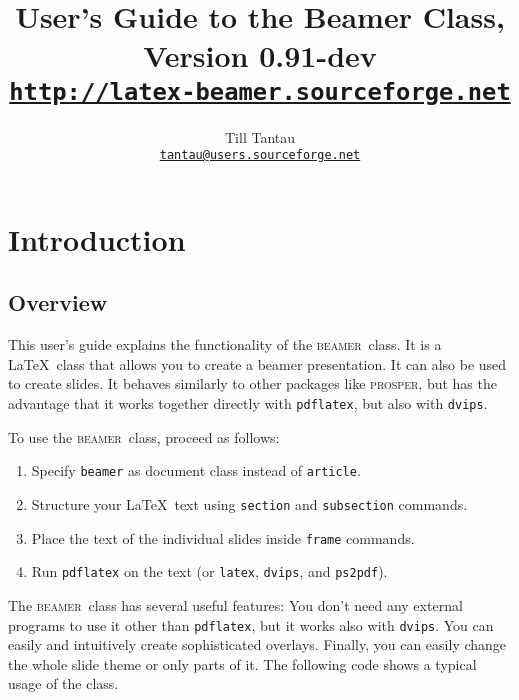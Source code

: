 \documentclass{article}
\def\beamer{\textsc{beamer}}
\begin{document}
\title{User's Guide to the Beamer Class, Version 0.91-dev\\
\Large\href{http://latex-beamer.sourceforge.net}{\texttt{http://latex-beamer.sourceforge.net}}}
\author{Till Tantau\\
  \href{mailto:tantau@users.sourceforge.net}{\texttt{tantau@users.sourceforge.net}}}

\maketitle

\tableofcontents



\section{Introduction}


\subsection{Overview}

This user's guide explains the functionality of the \beamer\ class.
It is a \LaTeX\ class that allows you to create a beamer
presentation. It can also be used to create slides. It behaves
similarly to other packages like \textsc{prosper}, but has the
advantage that it works together directly with \texttt{pdflatex}, but
also with \texttt{dvips}.

To use the \beamer\ class, proceed as follows:
\begin{enumerate}
\item
  Specify \texttt{beamer} as document class instead of
  \texttt{article}.
\item
  Structure your \LaTeX\ text using \texttt{section} and
  \texttt{subsection} commands.
\item
  Place the text of the individual slides inside \texttt{frame}
  commands.
\item
  Run \texttt{pdflatex} on the text (or \texttt{latex},
  \texttt{dvips}, and \texttt{ps2pdf}).
\end{enumerate}

The \beamer\ class has several useful features: You don't need any
external programs to use it other than \texttt{pdflatex}, but it works
also with \texttt{dvips}. You can easily and intuitively create
sophisticated overlays. Finally, you can easily change the whole slide
theme or only parts of it. The following code shows a typical usage of
the class.
\end{document}
